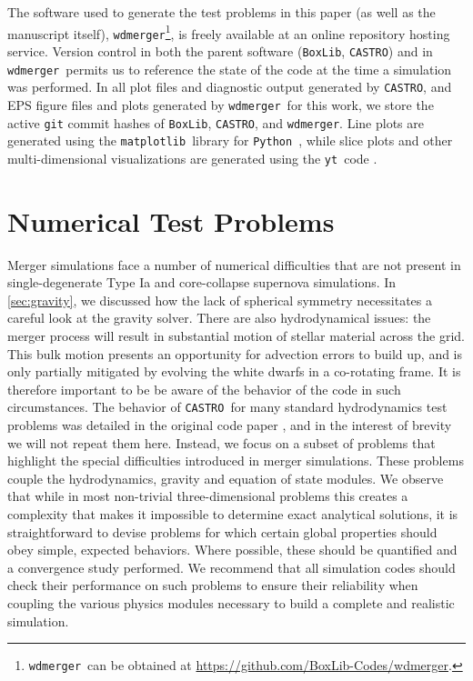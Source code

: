\documentclass[iop]{../emulateapj}
\newcommand{\boxlib}{\texttt{BoxLib}}
\newcommand{\castro}{\texttt{CASTRO}}
\newcommand{\wdmerger}{\texttt{wdmerger}}
\newcommand{\python}{\texttt{Python}}
\newcommand{\matplotlib}{\texttt{matplotlib}}
\newcommand{\yt}{\texttt{yt}}
\begin{document}
The software used to generate the test problems in this paper
(as well as the manuscript itself),
\wdmerger\footnote{\wdmerger\ can be obtained at \url{https://github.com/BoxLib-Codes/wdmerger}.},
is freely available at an online repository hosting service.
Version control in both the parent software (\boxlib, \castro) and in \wdmerger\
permits us to reference the state of the code at the time a simulation
was performed. In all plot files and diagnostic output generated by \castro, 
and EPS figure files and plots generated by \wdmerger\ for this work,
we store the active \texttt{git} commit hashes of \boxlib, \castro, and \wdmerger.
Line plots are generated using the \matplotlib\ library for \python\ 
\citep{matplotlib}, while slice plots and other multi-dimensional visualizations are 
generated using the \yt\ code \citep{yt}.



\section{Numerical Test Problems}\label{sec:Tests}

Merger simulations face a number of numerical difficulties that are
not present in single-degenerate Type Ia and core-collapse supernova
simulations. In \autoref{sec:gravity}, we discussed how the lack
of spherical symmetry necessitates a careful look at the gravity
solver. There are also hydrodynamical issues: the merger process will
result in substantial motion of stellar material across the grid. This
bulk motion presents an opportunity for advection errors to build up,
and is only partially mitigated by evolving the white dwarfs in a
co-rotating frame. It is therefore important to be be aware of the
behavior of the code in such circumstances. The behavior of \castro\ for
many standard hydrodynamics test problems was detailed in the original
code paper \citep{castro}, and in the interest of brevity we will not
repeat them here. Instead, we focus on a subset of problems that
highlight the special difficulties introduced in merger
simulations. These problems couple the hydrodynamics, gravity and
equation of state modules. We observe that while in most non-trivial
three-dimensional problems this creates a complexity that makes it
impossible to determine exact analytical solutions, it is
straightforward to devise problems for which certain global properties
should obey simple, expected behaviors. Where possible, these should
be quantified and a convergence study performed. We recommend that all
simulation codes should check their performance on such problems to
ensure their reliability when coupling the various physics modules
necessary to build a complete and realistic simulation.
\end{document}
